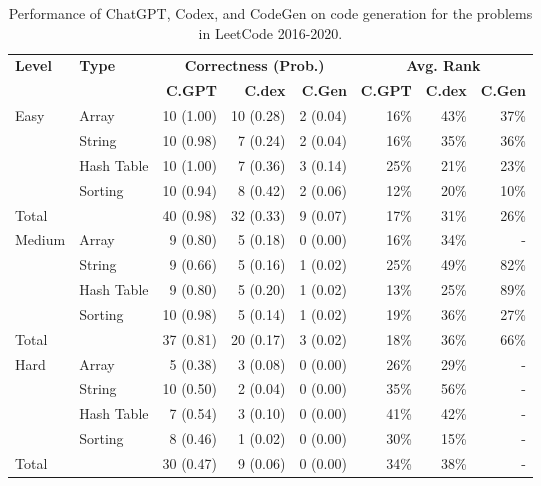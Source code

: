 \begin{table}[t]
	\centering
	\caption{Performance of ChatGPT, Codex, and CodeGen on code generation for the problems in LeetCode 2016-2020.}
	\label{tab:code_generation_leetcode_2016-20}
	\resizebox{1\linewidth}{!}
	{
		\begin{tabular}{l|l|rrr|rrr}
			\toprule
			\multirow{2}{*}{\bf Level} & \multirow{2}{*}{\bf Type} & \multicolumn{3}{c|}{\bf Correctness (Prob.)} & \multicolumn{3}{c}{\bf Avg. Rank }\\\cline{3-8}
			& & {\bf C.GPT} & {\bf C.dex} & {\bf C.Gen} & {\bf C.GPT} & {\bf C.dex} & {\bf C.Gen} \\
			\hline
				\multirow{4}{*}{Easy}
			& Array & 10 (1.00) & 10 (0.28) & 2 (0.04) & 16\% & 43\% & 37\% \\
			& String & 10 (0.98) & 7 (0.24) & 2 (0.04) & 16\% & 35\% & 36\% \\
			& Hash Table & 10 (1.00) & 7 (0.36) & 3 (0.14) & 25\% & 21\% & 23\% \\
			& Sorting & 10 (0.94) & 8 (0.42) & 2 (0.06) & 12\% & 20\% & 10\% \\
			\hline
			Total &  & 40 (0.98) & 32 (0.33) & 9 (0.07)  & 17\% & 31\% & 26\% \\
			\hline
				\multirow{4}{*}{Medium}
			& Array & 9 (0.80) & 5 (0.18) & 0 (0.00) & 16\% & 34\% &  -  \\
			& String & 9 (0.66) & 5 (0.16) & 1 (0.02) & 25\% & 49\% & 82\% \\
			& Hash Table & 9 (0.80) & 5 (0.20) & 1 (0.02) & 13\% & 25\% & 89\% \\
			& Sorting & 10 (0.98) & 5 (0.14) & 1 (0.02) & 19\% & 36\% & 27\% \\
			\hline
			Total &  & 37 (0.81) & 20 (0.17) & 3 (0.02)  & 18\% & 36\% & 66\% \\
			\hline
				\multirow{4}{*}{Hard}
			& Array & 5 (0.38) & 3 (0.08) & 0 (0.00) & 26\% & 29\% &  -  \\
			& String & 10 (0.50) & 2 (0.04) & 0 (0.00) & 35\% & 56\% &  -  \\
			& Hash Table & 7 (0.54) & 3 (0.10) & 0 (0.00) & 41\% & 42\% &  -  \\
			& Sorting & 8 (0.46) & 1 (0.02) & 0 (0.00) & 30\% & 15\% &  -  \\
			\hline
			Total &  & 30 (0.47) & 9 (0.06) & 0 (0.00)  & 34\% & 38\% &  -  \\
			\bottomrule
		\end{tabular}
	}
\end{table}
